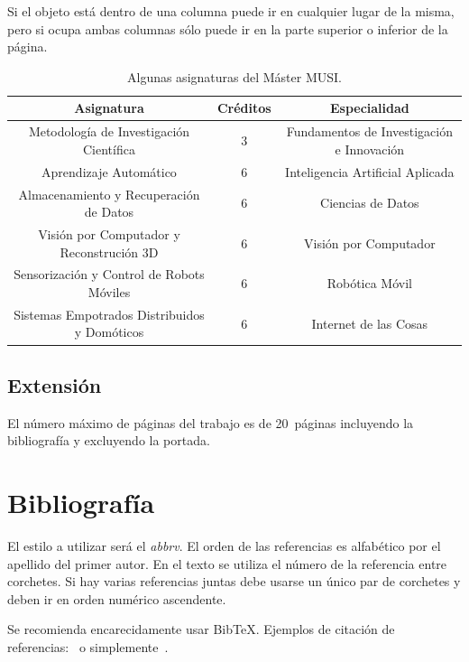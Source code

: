 \documentclass[twocolumn,twoside,a4paper, 10pt]{IEEEtran}
\begin{document}
Si el objeto está dentro de una columna puede ir en cualquier lugar de la misma, pero si ocupa ambas columnas sólo puede ir en la parte superior o inferior de la página.

\begin{table}
	\caption{Algunas asignaturas del Máster MUSI.}
	\label{tab:table1}
	\begin{center}
	\begin{tabular}{ccc}
		\textbf{Asignatura} & \textbf{Créditos} & \textbf{Especialidad} \\\hline
		Metodología de Investigación Científica & 3 & Fundamentos de Investigación e Innovación \\\hline
		Aprendizaje Automático & 6 & Inteligencia Artificial Aplicada \\\hline
		Almacenamiento y Recuperación de Datos & 6 & Ciencias de Datos \\\hline
		Visión por Computador y Reconstrución 3D & 6 & Visión por Computador \\\hline
		Sensorización y Control de Robots Móviles & 6 & Robótica Móvil \\\hline
		Sistemas Empotrados Distribuidos y Domóticos & 6 & Internet de las Cosas \\\hline
	\end{tabular}
	\end{center}
\end{table}

\subsection{Extensión}

El número máximo de páginas del trabajo es de 20~páginas incluyendo la bibliografía y excluyendo la portada.

\section{Bibliografía}

El estilo a utilizar será el \textit{abbrv}. El orden de las referencias es alfabético por el apellido del primer autor. En el texto se utiliza el número de la referencia entre 
corchetes. Si hay varias referencias juntas debe usarse un único par de corchetes y deben ir en orden numérico ascendente.

Se recomienda encarecidamente usar BibTeX. Ejemplos de citación de referencias:~\cite{Cre93,McCPit88} o simplemente~\cite{Wei91}.
\end{document}

